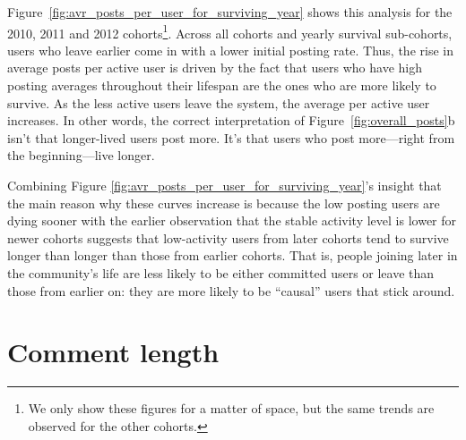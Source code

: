 Figure~\ref{fig:avr_posts_per_user_for_surviving_year} shows this analysis for the 2010, 2011 and 2012 cohorts\footnote{We only show these figures for a matter of space, but the same trends are observed for the other cohorts.}.  Across all cohorts and yearly survival sub-cohorts, users who leave earlier come in with a lower initial posting rate.  Thus, the rise in average posts per active user is driven by the fact that users who have high posting averages throughout their lifespan are the ones who are more likely to survive.  As the less active users leave the system, the average per active user increases.  In other words, the correct interpretation of Figure~\ref{fig:overall_posts}b isn't that longer-lived users post more.  It's that users who post more---right from the beginning---live longer. 

\begin{figure*}[!tb]
\centering
{}
\caption{Each Figure corresponds to one cohort, from 2010 to 2012, left to right. The users for each cohort are further divided in groups based on how long they survived: users that survived up to 1 year are labeled 0, from 1 to 2 years are labeled 1, and so on.  For all cohorts, longer-tenured users started at higher activity levels than shorter-tenured ones.}
\label{fig:avr_posts_per_user_for_surviving_year}
\end{figure*}

Combining Figure \ref{fig:avr_posts_per_user_for_surviving_year}'s insight that the main reason why these curves increase is because the low posting users are dying sooner with the earlier observation that the stable activity level is lower for newer cohorts suggests that low-activity users from later cohorts tend to survive longer than longer than those from earlier cohorts.  That is, people joining later in the community's life are less likely to be either committed users or leave than those from earlier on: they are more likely to be ``causal'' users that stick around.

\section{Comment length}

